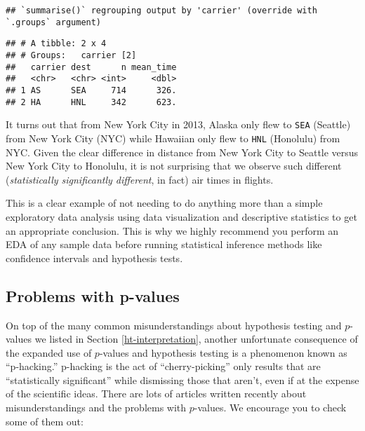 \documentclass[
]{book}
\begin{document}
\begin{verbatim}
## `summarise()` regrouping output by 'carrier' (override with `.groups` argument)
\end{verbatim}

\begin{verbatim}
## # A tibble: 2 x 4
## # Groups:   carrier [2]
##   carrier dest      n mean_time
##   <chr>   <chr> <int>     <dbl>
## 1 AS      SEA     714      326.
## 2 HA      HNL     342      623.
\end{verbatim}

It turns out that from New York City in 2013, Alaska only flew to \texttt{SEA} (Seattle) from New York City (NYC) while Hawaiian only flew to \texttt{HNL} (Honolulu) from NYC. Given the clear difference in distance from New York City to Seattle versus New York City to Honolulu, it is not surprising that we observe such different (\emph{statistically significantly different}, in fact) air times in flights.

This is a clear example of not needing to do anything more than a simple exploratory data analysis using data visualization and descriptive statistics to get an appropriate conclusion. This is why we highly recommend you perform an EDA of any sample data before running statistical inference methods like confidence intervals and hypothesis tests.

\hypertarget{problems-with-p-values}{%
\subsection{Problems with p-values}\label{problems-with-p-values}}

On top of the many common misunderstandings about hypothesis testing and \(p\)-values we listed in Section \ref{ht-interpretation}, another unfortunate consequence of the expanded use of \(p\)-values and hypothesis testing is a phenomenon known as ``p-hacking.''  p-hacking is the act of ``cherry-picking'' only results that are ``statistically significant'' while dismissing those that aren't, even if at the expense of the scientific ideas. There are lots of articles written recently about misunderstandings and the problems with \(p\)-values. We encourage you to check some of them out:
\end{document}
